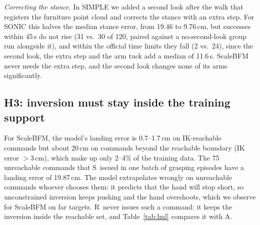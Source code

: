 \documentclass[conference]{IEEEtran}
\newcommand{\Ad}{\textsc{A}}   %
\newcommand{\Sinv}{\textsc{S}} %
\newcommand{\Rr}{\textsc{R}}   %
\begin{document}
\emph{Correcting the stance.} In SIMPLE we added a second look after the walk that registers the furniture point cloud and corrects the stance with an extra step. For SONIC this halves the median stance error, from 19.46 to 9.76\,cm, but successes within 45\,s do not rise (31 vs.\ 30 of 120, paired against a no-second-look group run alongside it), and within the official time limits they fall (2 vs.\ 24), since the second look, the extra step and the arm tuck add a median of 11.6\,s. ScaleBFM never needs the extra step, and the second look changes none of its arms significantly.

\subsection{H3: inversion must stay inside the training support}
For ScaleBFM, the model's landing error is 0.7--1.7\,cm on IK-reachable commands but about 20\,cm on commands beyond the reachable boundary (IK error $>3$\,cm), which make up only 2--4\% of the training data. The 75 unreachable commands that \Sinv\ issued in one batch of grasping episodes have a landing error of 19.87\,cm. The model extrapolates wrongly on unreachable commands whoever chooses them: it predicts that the hand will stop short, so unconstrained inversion keeps pushing and the hand overshoots, which we observe for ScaleBFM on far targets. \Rr\ never issues such a command: it keeps the inversion inside the reachable set, and Table~\ref{tab:lml} compares it with \Ad.
\end{document}
